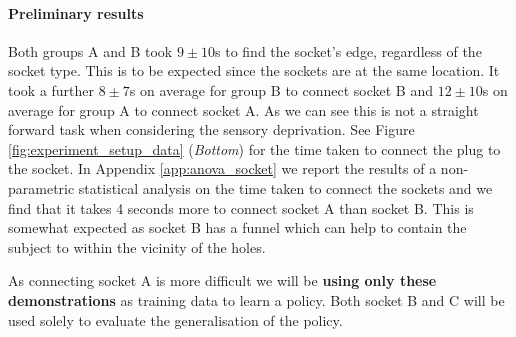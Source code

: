 

\paragraph{Preliminary results}

Both groups A and B took $9\pm10$s to find the socket's edge, regardless of the socket type. This is to be expected since the sockets 
are at the same location. It took a further $8\pm7$s on average for group B to connect
socket B and $12\pm10$s on average for group A to connect socket A. As we can see this is not a straight forward task when considering
the sensory deprivation. See Figure \ref{fig:experiment_setup_data} (\textit{Bottom}) for the time taken to connect the plug to the socket.
In Appendix \ref{app:anova_socket} we report the results of a non-parametric statistical analysis on the time taken to connect
the sockets and we find that it takes 4 seconds more to connect socket A than socket B. This is somewhat expected as 
socket B has a funnel which can help to contain the subject to within the vicinity of the holes.

As connecting socket A is more difficult we will be \textbf{using only these demonstrations} as training data to learn a policy. Both
socket B and C will be used solely to evaluate the generalisation of the policy.

